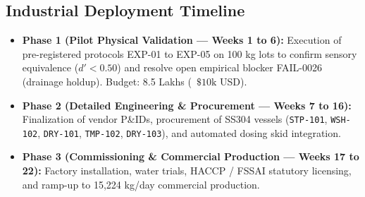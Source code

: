 \documentclass[10pt,a4paper]{article}
\newcommand{\inr}{\text{INR~}}
\begin{document}
\subsection*{Industrial Deployment Timeline}
\begin{itemize}[leftmargin=1.5em]
    \item \textbf{Phase 1 (Pilot Physical Validation --- Weeks 1 to 6):} Execution of pre-registered protocols EXP-01 to EXP-05 on 100 kg lots to confirm sensory equivalence ($d' < 0.50$) and resolve open empirical blocker FAIL-0026 (drainage holdup). Budget: \inr8.5 Lakhs (~$\$10\mathrm{k}$ USD).
    \item \textbf{Phase 2 (Detailed Engineering \& Procurement --- Weeks 7 to 16):} Finalization of vendor P\&IDs, procurement of SS304 vessels (\texttt{STP-101}, \texttt{WSH-102}, \texttt{DRY-101}, \texttt{TMP-102}, \texttt{DRY-103}), and automated dosing skid integration.
    \item \textbf{Phase 3 (Commissioning \& Commercial Production --- Weeks 17 to 22):} Factory installation, water trials, HACCP / FSSAI statutory licensing, and ramp-up to 15,224 kg/day commercial production.
\end{itemize}
\end{document}
